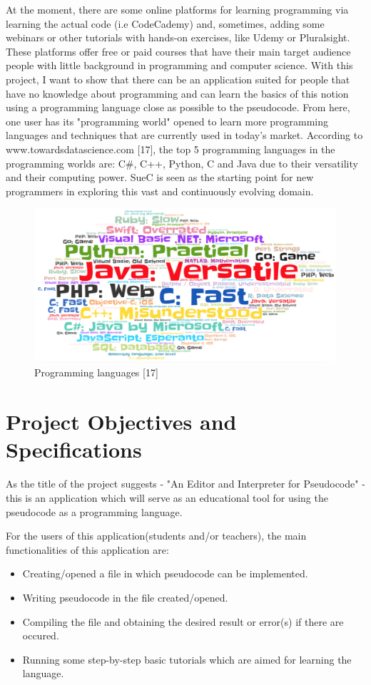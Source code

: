 \documentclass[12pt,a4paper,twoside]{report}
\begin{document}
	At the moment, there are some online platforms for learning programming via learning the actual code (i.e CodeCademy) and, sometimes, adding some webinars or other tutorials with hands-on exercises, like Udemy or Pluralsight. These platforms offer free or paid courses that have their main target audience people with little background in programming and computer science. With this project, I want to show that there can be an application suited for people that have no knowledge about programming and can learn the basics of this notion using a programming language close as possible to the pseudocode. From here, one user has its "programming world" opened to learn more programming languages and techniques that are currently used in today's market. According to www.towardsdatascience.com [17], the top 5 programming languages in the programming worlds are: C\#, C++, Python, C and Java due to their versatility and their computing power. SueC is seen as the starting point for new programmers in exploring this vast and continuously evolving domain. 
	
	
	\begin{figure}[H]
		\centering
		\includegraphics[scale=0.22]{img/diags/proglang.png}
		\caption{Programming languages [17]}
	\end{figure}
	
	
	

\chapter{Project Objectives and Specifications}


As the title of the project suggests - "An Editor and Interpreter for Pseudocode" - this is an application which will serve as an educational tool for using the pseudocode as a programming language.

For the users of this application(students and/or teachers), the main functionalities of this application are:
\begin{itemize}
	\item Creating/opened a file in which pseudocode can be implemented.
	\item Writing pseudocode in the file created/opened.
	\item Compiling the file and obtaining the desired result or error(s) if there are occured.
	\item Running some step-by-step basic tutorials which are aimed for learning the language.
\end{itemize}
\end{document}
